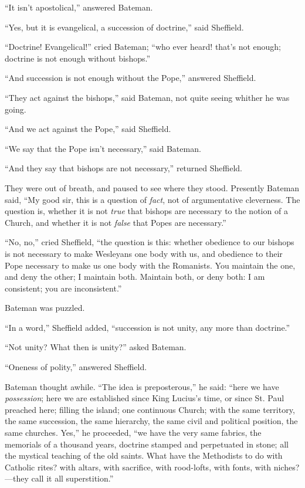``It isn't apostolical,'' answered Bateman.

``Yes, but it is evangelical, a succession of doctrine,''
said Sheffield.

``Doctrine! Evangelical!'' cried Bateman; ``who ever
heard! that's not enough; doctrine is not enough without
bishops.''

``And succession is not enough without the Pope,'' answered
Sheffield.

``They act against the bishops,'' said Bateman, not quite
seeing whither he was going.

``And we act against the Pope,'' said Sheffield.

``We say that the Pope isn't necessary,'' said Bateman.

``And they say that bishops are not necessary,'' returned
Sheffield.

They were out of breath, and paused to see where they stood.
Presently Bateman said, ``My good sir, this is a question of \emph{fact},
not of argumentative cleverness. The question is, whether it is not \emph{true}
that bishops are necessary to the notion of a Church, and whether it
is not \emph{false} that Popes are necessary.''

``No, no,'' cried Sheffield, ``the question is this:
whether obedience to our bishops is not necessary to make Wesleyans
one body with us, and obedience to their Pope necessary to make us one
body with the Romanists. You maintain the one, and deny the other; I
maintain both. Maintain both, or deny both: I am consistent; you are
inconsistent.''

Bateman was puzzled.

``In a word,'' Sheffield added, ``succession is not
unity, any more than doctrine.''

``Not unity? What then is unity?'' asked Bateman.

``Oneness of polity,'' answered Sheffield.

Bateman thought awhile. ``The idea is preposterous,'' he
said: ``here we have \emph{possession}; here we are established
since King Lucius's time, or since St. Paul preached here; filling the
island; one continuous Church; with the same territory, the same
succession, the same hierarchy, the same civil and political position,
the same churches. Yes,'' he proceeded, ``we have the very
same fabrics, the memorials of a thousand years, doctrine stamped
and perpetuated in stone; all the mystical teaching of the old saints.
What have the Methodists to do with Catholic rites? with altars, with
sacrifice, with rood-lofts, with fonts, with niches?—they call it
all superstition.''


